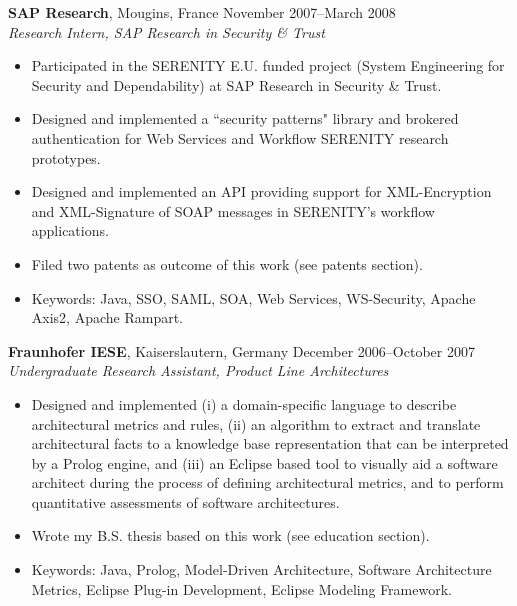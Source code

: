 \documentclass[line,margin]{res}
\begin{document}
\begin{resume}
                \textbf{SAP Research}, Mougins, France \hfill November 2007--March 2008 \\
                {\sl Research Intern, SAP Research in Security \& Trust}
                \begin{itemize}  \itemsep -2pt
                \item Participated in the SERENITY E.U. funded project (System Engineering for Security and 
                Dependability) at SAP Research in Security \& Trust.
                \item Designed and implemented a ``security patterns" library and brokered authentication for 
                Web Services and Workflow SERENITY research prototypes.
                \item Designed and implemented an API providing support for XML-Encryption and 
                XML-Signature of SOAP messages in SERENITY's workflow applications.
                \item Filed two patents as outcome of this work (see patents section).
                \item Keywords: Java, SSO, SAML, SOA, Web Services, WS-Security, Apache Axis2,
                Apache Rampart.
                \end{itemize} 

                \textbf{Fraunhofer IESE}, Kaiserslautern, Germany \hfill December 2006--October 2007\\
                {\sl Undergraduate Research Assistant, Product Line Architectures}
                \begin{itemize}  \itemsep -2pt
                \item Designed and implemented (i) a domain-specific language to describe architectural 
                metrics and rules, (ii) an algorithm to extract and translate architectural facts to a knowledge 
                base representation that can be interpreted by a Prolog engine, and (iii) an Eclipse based tool 
                to visually aid a software architect during the process of defining architectural metrics, and to 
                perform quantitative assessments of software architectures.
                \item Wrote my B.S. thesis based on this work (see education section).
                \item Keywords: Java, Prolog, Model-Driven Architecture, Software Architecture Metrics, 
                Eclipse Plug-in Development, Eclipse Modeling Framework.
                \end{itemize}


\end{resume}
\end{document}
